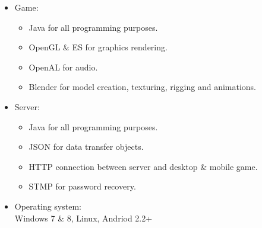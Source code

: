 \documentclass[letterpaper]{article}
\begin{document}
			\begin{itemize}
				\item Game:
					\begin{itemize}
						\item Java for all programming purposes.
						\item OpenGL \& ES for graphics rendering.
						\item OpenAL for audio.
						\item Blender for model creation, texturing, rigging and animations.
					\end{itemize}
				\item Server:
					\begin{itemize}
						\item Java for all programming purposes.
						\item JSON for data transfer objects.
						\item HTTP connection between server and desktop \& mobile game.
						\item STMP for password recovery.
					\end{itemize}
				\item Operating system: \\
					  Windows 7 \& 8, Linux, Andriod 2.2+
			\end{itemize}
			
		\vspace{0.2in}
		\section*{\colorbox{black}{}}
		\vspace{0.1in}
				
\end{document}
